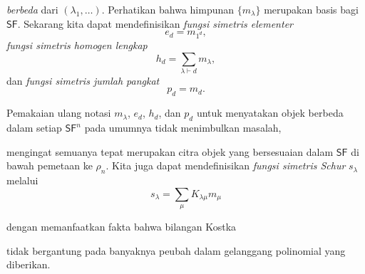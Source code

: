 \documentclass[12pt]{article}
\theoremstyle{plain}
\theoremstyle{definition}
\theoremstyle{remark}
\numberwithin{equation}{section}
\begin{document}
\emph{berbeda} dari $(\lambda_1,\ldots)$.
Perhatikan bahwa himpunan $\{ m_\lambda\}$ merupakan basis bagi $\mathsf{SF}$.
Sekarang kita dapat mendefinisikan \emph{fungsi simetris elementer}
\[
e_d = m_{1^d},
\]
\emph{fungsi simetris homogen lengkap}
\[
h_d = \sum_{\lambda \vdash d} m_\lambda ,
\]
dan \emph{fungsi simetris jumlah pangkat}
\[
p_d = m_{d}.
\]

Pemakaian ulang notasi $m_\lambda$, $e_d$, $h_d$, dan $p_d$ untuk menyatakan
objek berbeda dalam setiap $\mathsf{SF}^n$ pada umumnya tidak menimbulkan masalah,

mengingat semuanya tepat merupakan citra objek yang
bersesuaian dalam $\mathsf{SF}$ di bawah pemetaan ke $\rho_n$.
Kita juga dapat mendefinisikan \emph{fungsi simetris Schur}
$s_\lambda$ melalui 
\[
s_\lambda = \sum_{\mu} K_{\lambda \mu} m_\mu
\]

dengan memanfaatkan fakta bahwa bilangan Kostka

tidak bergantung pada banyaknya peubah dalam gelanggang polinomial yang diberikan.
\end{document}
